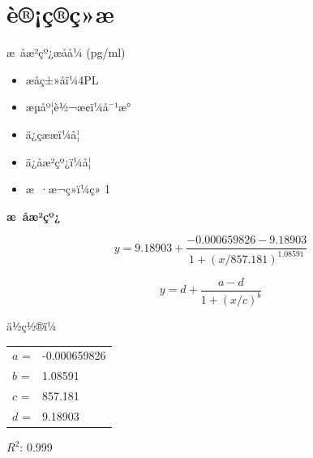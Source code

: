 \documentclass[UTF8,10pt,a4paper,fontset=fandol]{ctexart}
\newcommand{\fieldvalue}[1]{#1}
\begin{document}
\section*{è®¡ç®ç»æ}

æ åæ²çº¿æåå¼ (pg/ml)

\begin{itemize}
\item
æåç±»åï¼\fieldvalue{4PL}
\item
æµåº¦è½¬æ¢ï¼\fieldvalue{å¯¹æ°}
\item
ä¿çææï¼\fieldvalue{å¦}
\item
ä¿å­æ²çº¿ï¼\fieldvalue{å¦}
\item
æ ·æ¬ç»ï¼\fieldvalue{ç» 1}
\end{itemize}

\begin{center}
\textbf{æ åæ²çº¿}

\end{center}

\[
y=9.18903+
\frac{-0.000659826-9.18903}
{1+\left(x/857.181\right)^{1.08591}}
\]

\newpage

\[
y = d + \frac{a-d}{1+(x/c)^b}
\]

ä½ç½®ï¼

\begin{tabular}{ll}
$a$ = &
\fieldvalue{-0.000659826} \\
$b$ = &
\fieldvalue{1.08591} \\
$c$ = &
\fieldvalue{857.181} \\
$d$ = &
\fieldvalue{9.18903}
\end{tabular}

$R^2$:
\fieldvalue{0.999}
\end{document}
